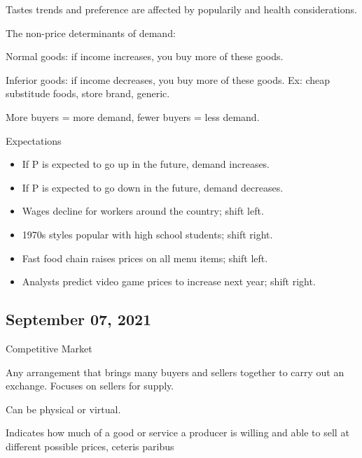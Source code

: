 \documentclass{scrreprt} %
\begin{document}
Tastes trends and preference are affected by popularily and health considerations.

The non-price determinants of demand:

\begin{definition}
	Normal goods: if income increases, you buy more of these goods.

	Inferior goods: if income decreases, you buy more of these goods. Ex: 
	cheap substitude foods, store brand, generic.
\end{definition}

More buyers = more demand, fewer buyers = less demand.

Expectations

\begin{itemize}
	\item If P is expected to go up in the future, demand increases.
	\item If P is expected to go down in the future, demand decreases.
\end{itemize}

\begin{example}
	\begin{itemize}
		\item Wages decline for workers around the country; shift left.
		\item 1970s styles popular with high school students; shift right.
		\item Fast food chain raises prices on all menu items; shift left.
		\item Analysts predict video game prices to increase next year; shift right.
	\end{itemize}
\end{example}

\subsection{September 07, 2021}

\begin{definition}
	Competitive Market

	Any arrangement that brings many buyers and sellers together to
	carry out an exchange. Focuses on sellers for supply.
	
	Can be physical or virtual.
\end{definition}

\begin{definition}
	Indicates how much of a good or service a producer is willing and able
	to sell at different possible prices, ceteris paribus
\end{definition}
\end{document}
